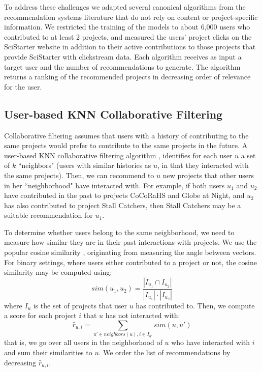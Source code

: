 \documentclass[letterpaper]{article} %
\begin{document}
 To address these challenges we adapted several canonical algorithms from the recommendation systems literature that do not 
 rely on content or project-specific information. We restricted the training of the models to about 6,000 users 
 who contributed to at least 2 projects, and measured the users' project clicks on the SciStarter website in addition to their active contributions to those projects that provide SciStarter  with clickstream data. 
Each algorithm receives as input a target user and the number of recommendations to generate.
The algorithm returns a ranking of  the   recommended projects in decreasing order of relevance for the user.

\subsection{User-based KNN Collaborative Filtering}

Collaborative filtering assumes that users with a history of contributing to the same projects would prefer to contribute to the same projects in the future. A user-based KNN collaborative filtering  algorithm \cite{ning2015comprehensive},   identifies for each user $u$ a set of $k$ ``neighbors" (users with similar histories as $u$, in that they  interacted with the same projects). Then, we can recommend to $u$ new projects  that other users in her ``neighborhood" have interacted with.
For example, if both users $u_1$ and $u_2$ have contributed in the past to projects CoCoRaHS and Globe at Night, and $u_2$ has also contributed to project Stall Catchers, then Stall Catchers may be a suitable recommendation for $u_1$.

To determine whether users belong to the same neighborhood, we need to measure how similar they are in their past interactions with projects. We use the popular cosine similarity \cite{Breese98empiricalanalysis}, originating from measuring the angle between vectors. For binary settings, where users either contributed to a project or not, the cosine similarity may be computed using:
\begin{equation}
    sim(u_1,u_2) = \frac{|I_{u_1} \cap I_{u_2}|}{|I_{u_1}|\cdot|I_{u_2}|}
\end{equation}
where $I_u$ is the set of projects that user $u$ has contributed to.
Then, we compute a score for each project $i$ that $u$ has not interacted with:
\begin{equation}
    \hat{r}_{u,i} = \sum_{u' \in neighbors(u), i \in I_{u'}} sim(u,u')
\end{equation}
that is, we go over all users in the neighborhood of $u$ who have interacted with $i$ and sum their similarities to $u$. We order the list of recommendations by decreasing $\hat{r}_{u,i}$.
\end{document}
